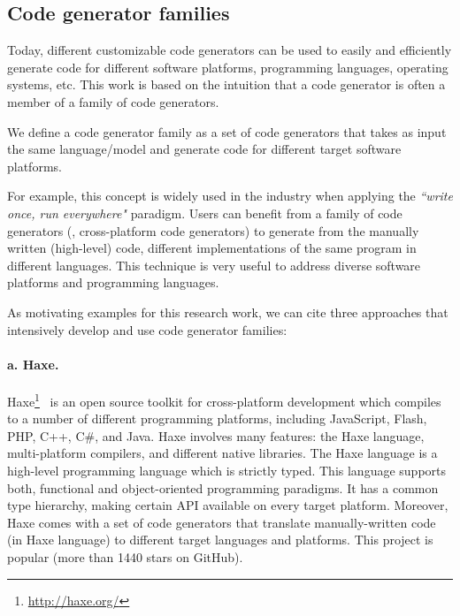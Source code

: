 \subsection{Code generator families}
Today, different customizable code generators can be used to easily and efficiently generate code for different software platforms, programming languages, operating systems, etc. This work is based on the intuition that a code generator is often a member of a family of code generators\cite{chae2008building}.

\begin{mydef}
	We define a code generator family as a set of code generators that takes as input the same language/model and generate code for different target software platforms.
\end{mydef}

For example, this concept is widely used in the industry when applying the \textit{``write once, run everywhere"} paradigm. Users can benefit from a family of code generators (\eg, cross-platform code generators\cite{fumero2015runtime}) to generate from the manually written (high-level) code, different implementations of the same program in different languages. This technique is very useful to address diverse software platforms and programming languages.

As motivating examples for this research work, we can cite three approaches that intensively develop and use code generator families: 
\paragraph{a. Haxe.} 	Haxe\footnote{\url{http://haxe.org/}}~\cite{dasnois2011haxe} is an open source toolkit for cross-platform development which compiles to a number of different programming platforms, including JavaScript, Flash, PHP, C++, C\#, and Java. Haxe involves many features: the Haxe language, multi-platform compilers, and different native libraries. The Haxe language is a high-level programming language which is strictly typed. This language supports both, functional and object-oriented programming paradigms. It has a common type hierarchy, making certain API available on every target platform. Moreover, Haxe comes with a set of code generators that translate manually-written code (in Haxe language) to different target languages and platforms.  
This project is popular (more than \num{1440} stars on GitHub).

